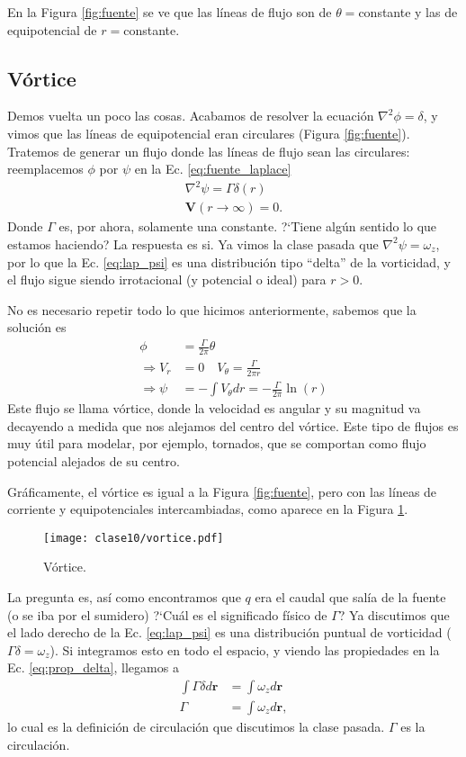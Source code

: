 En la Figura \ref{fig:fuente} se ve que las líneas de flujo son de $\theta=$constante y las de equipotencial de $r=$constante.

\subsection*{Vórtice}
Demos vuelta un poco las cosas.
Acabamos de resolver la ecuación $\nabla^2\phi=\delta$, y vimos que las líneas de equipotencial eran circulares (Figura \ref{fig:fuente}).
Tratemos de generar un flujo donde las líneas de flujo sean las circulares: reemplacemos $\phi$ por $\psi$ en la Ec. \eqref{eq:fuente_laplace}
%
\begin{align}\label{eq:lap_psi}
\nabla^2\psi=\Gamma\delta(r)\nonumber\\
\mathbf{V}(r\to\infty)=0.
\end{align}
%
Donde $\Gamma$ es, por ahora, solamente una constante.
\mbox{?`}Tiene algún sentido lo que estamos haciendo? La respuesta es si.
Ya vimos la clase pasada que $\nabla^2\psi=\omega_z$, por lo que la Ec. \eqref{eq:lap_psi} es una distribución tipo ``delta'' de la vorticidad, y el flujo sigue siendo irrotacional (y potencial o ideal) para $r>0$.

No es necesario repetir todo lo que hicimos anteriormente, sabemos que la solución es 
%
\begin{align}
\phi&=\frac{\Gamma}{2\pi}\theta \nonumber\\
\Rightarrow V_r &= 0 \quad V_\theta=\frac{\Gamma}{2\pi r}\nonumber\\
\Rightarrow \psi &= -\int V_\theta dr = -\frac{\Gamma}{2\pi}\ln(r)
\end{align}
%
Este flujo se llama vórtice, donde la velocidad es angular y su magnitud va decayendo a medida que nos alejamos del centro del vórtice.
Este tipo de flujos es muy útil para modelar, por ejemplo, tornados, que se comportan como flujo potencial alejados de su centro.

Gráficamente, el vórtice es igual a la Figura \ref{fig:fuente}, pero con las líneas de corriente y equipotenciales intercambiadas, como aparece en la Figura \ref{fig:vortice}.

\begin{figure}[h!]
\centering
\texttt{[image: clase10/vortice.pdf]}
\caption{Vórtice.}
\label{fig:vortice}
\end{figure}

La pregunta es, así como encontramos que $q$ era el caudal que salía de la fuente (o se iba por el sumidero) \mbox{?`}Cuál es el significado físico de $\Gamma$?
Ya discutimos que el lado derecho de la Ec. \eqref{eq:lap_psi} es una distribución puntual de vorticidad ($\Gamma\delta=\omega_z$).
Si integramos esto en todo el espacio, y viendo las propiedades en la Ec. \eqref{eq:prop_delta}, llegamos a
%
\begin{align}
\int\Gamma\delta d\mathbf{r} &= \int\omega_z d\mathbf{r}\nonumber\\
\Gamma &= \int\omega_z d\mathbf{r},
\end{align}
%
lo cual es la definición de circulación que discutimos la clase pasada.
$\Gamma$ es la circulación.

